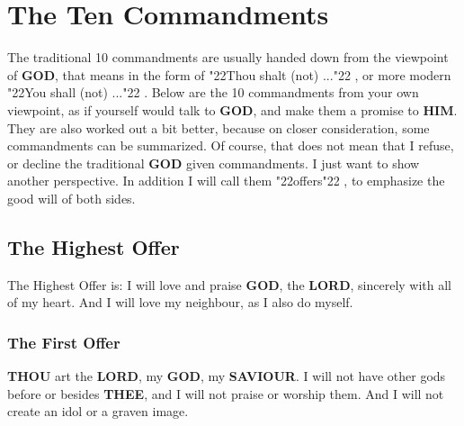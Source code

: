 \documentclass[12pt,a4paper]{article}
\newcommand{\God}[0]{\textbf{GOD}}
\newcommand{\Him}[0]{\textbf{HIM}}
\newcommand{\Lord}[0]{\textbf{LORD}}
\newcommand{\Saviour}[0]{\textbf{SAVIOUR}}
\newcommand{\Thee}[0]{\textbf{THEE}}
\newcommand{\Thou}[0]{\textbf{THOU}}
\newcommand{\q}[1]{\char"22{#1}\char"22 }
\begin{document}
		
		
	
	\newpage
	\section{The Ten Commandments}
		The traditional 10 commandments are usually handed down from the viewpoint of {\God},
		that means in the form of \q{Thou shalt (not) ...},
		or more modern \q{You shall (not) ...}.
		Below are the 10 commandments from your own viewpoint,
		as if yourself would talk to {\God},
		and make them a promise to {\Him}.
		They are also worked out a bit better,
		because on closer consideration,
		some commandments can be summarized.
		Of course,
		that does not mean that I refuse,
		or decline the traditional {\God} given commandments.
		I just want to show another perspective.
		In addition I will call them \q{offers},
		to emphasize the good will of both sides.
	
	\subsection{The Highest Offer}
		The Highest Offer is:
		I will love and praise {\God},
		the {\Lord},
		sincerely with all of my heart.
		And I will love my neighbour,
		as I also do myself.
		
	\subsubsection{The First Offer}
		{\Thou} art the {\Lord},
		my {\God},
		my {\Saviour}.
		I will not have other gods before or besides {\Thee},
		and I will not praise or worship them.
		And I will not create an idol or a graven image.
		
\end{document}
